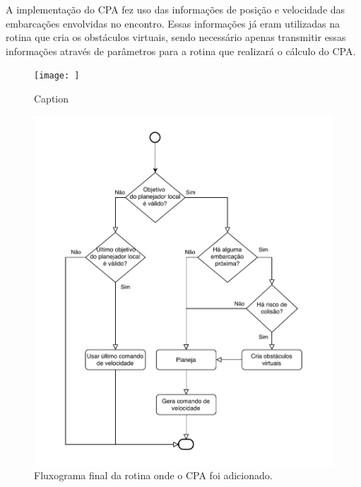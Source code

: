     A implementação do CPA fez uso das informações de posição e velocidade das embarcações envolvidas no encontro. Essas informações já eram utilizadas na rotina que cria os obstáculos virtuais, sendo necessário apenas transmitir essas informações através de parâmetros para a rotina que realizará o cálculo do CPA. 
    
    
    \begin{figure}
        \centering
        \texttt{[image: ]}
        \caption{Caption}
        \label{fig:my_label}
    \end{figure}
    
    \begin{figure}
        \centering
        \includegraphics{fig/chap4/find_best_path_diagram_cpa.pdf}
        \caption{Fluxograma final da rotina onde o CPA foi adicionado.}
        \label{fig:chap4_fluxograma_final}
    \end{figure}
    
    
